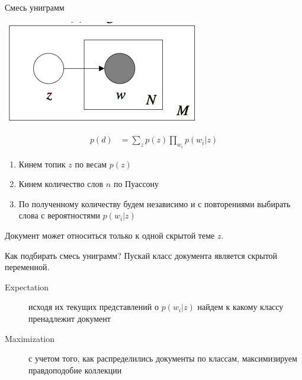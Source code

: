 \documentclass[14pt, fleqn, xcolor={dvipsnames, table}]{beamer}
\begin{document}
\begin{frame}{Смесь униграмм}
\small
\begin{center}
\includegraphics[height=0.3\textheight]{Mixture.png}
\end{center}
$$\begin{array}{ll}
p(d) &= \sum_{z}p(z)\prod_{w_i} p(w_i|z)
\end{array}$$
\begin{enumerate}
  \item Кинем топик $z$ по весам $p(z)$
  \item Кинем количество слов $n$ по Пуассону
  \item По полученному количеству будем независимо и с повторениями выбирать слова с вероятностями $p(w_i|z)$
\end{enumerate}
Документ может относиться только к одной скрытой теме $z$.
\end{frame}

\begin{frame}{Как подбирать смесь униграмм?}
Пускай класс документа является скрытой переменной.
\begin{description}
  \item[Expectation] исходя их текущих представлений о $p(w_i|z)$ найдем к какому классу пренадлежит документ
  \item[Maximization] с учетом того, как распределились документы по классам, максимизируем правдоподобие коллекции
\end{description}
\end{frame}
\end{document}
